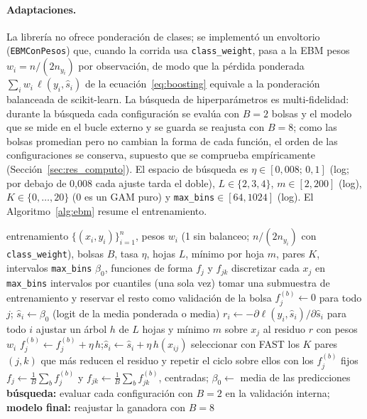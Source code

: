 \documentclass[pdflatex,sn-mathphys-num]{sn-jnl}
\begin{document}
\paragraph{Adaptaciones.}
La librería no ofrece ponderación de clases; se implementó un envoltorio (\texttt{EBMConPesos}) que, cuando la corrida usa \texttt{class\_weight}, pasa a la EBM pesos $w_i=n/(2n_{y_i})$ por observación, de modo que la pérdida ponderada $\sum_i w_i\,\ell(y_i,\hat s_i)$ de la ecuación~\eqref{eq:boosting} equivale a la ponderación balanceada de scikit-learn. La búsqueda de hiperparámetros es multi-fidelidad: durante la búsqueda cada configuración se evalúa con $B=2$ bolsas y el modelo que se mide en el bucle externo y se guarda se reajusta con $B=8$; como las bolsas promedian pero no cambian la forma de cada función, el orden de las configuraciones se conserva, supuesto que se comprueba empíricamente (Sección~\ref{sec:res_computo}). El espacio de búsqueda es $\eta\in[0{,}008;\,0{,}1]$ (log; por debajo de 0,008 cada ajuste tarda el doble), $L\in\{2,3,4\}$, $m\in[2,200]$ (log), $K\in\{0,\dots,20\}$ (0 es un GAM puro) y \texttt{max\_bins}$\in[64,1024]$ (log). El Algoritmo~\ref{alg:ebm} resume el entrenamiento.

\begin{algorithm}[htbp]
\caption{Entrenamiento de la EBM con bolsas externas, pesos de clase y multi-fidelidad}\label{alg:ebm}
\begin{algorithmic}[1]
\Require entrenamiento $\{(x_i,y_i)\}_{i=1}^n$, pesos $w_i$ (1 sin balanceo; $n/(2n_{y_i})$ con \texttt{class\_weight}), bolsas $B$, tasa $\eta$, hojas $L$, mínimo por hoja $m$, pares $K$, intervalos \texttt{max\_bins}
\Ensure $\beta_0$, funciones de forma $f_j$ y $f_{jk}$
\State discretizar cada $x_j$ en \texttt{max\_bins} intervalos por cuantiles (una sola vez)
    \State tomar una submuestra de entrenamiento y reservar el resto como validación de la bolsa
    \State $f_j^{(b)}\gets0$ para todo $j$; $\hat s_i\gets\beta_0$ (logit de la media ponderada o media)
         
            \State $r_i\gets-\partial\ell(y_i,\hat s_i)/\partial\hat s_i$ para todo $i$
            \State ajustar un árbol $h$ de $L$ hojas y mínimo $m$ sobre $x_j$ al residuo $r$ con pesos $w_i$
            \State $f_j^{(b)}\gets f_j^{(b)}+\eta\,h$;\quad $\hat s_i\gets\hat s_i+\eta\,h(x_{ij})$
        \EndFor
    \EndWhile
    \State seleccionar con FAST los $K$ pares $(j,k)$ que más reducen el residuo y repetir el ciclo sobre ellos con los $f_j^{(b)}$ fijos
\EndFor
\State $f_j\gets\frac{1}{B}\sum_b f_j^{(b)}$ y $f_{jk}\gets\frac{1}{B}\sum_b f_{jk}^{(b)}$, centradas; $\beta_0\gets$ media de las predicciones
\State \textbf{búsqueda:} evaluar cada configuración con $B=2$ en la validación interna; \textbf{modelo final:} reajustar la ganadora con $B=8$
\end{algorithmic}
\end{algorithm}
\end{document}
